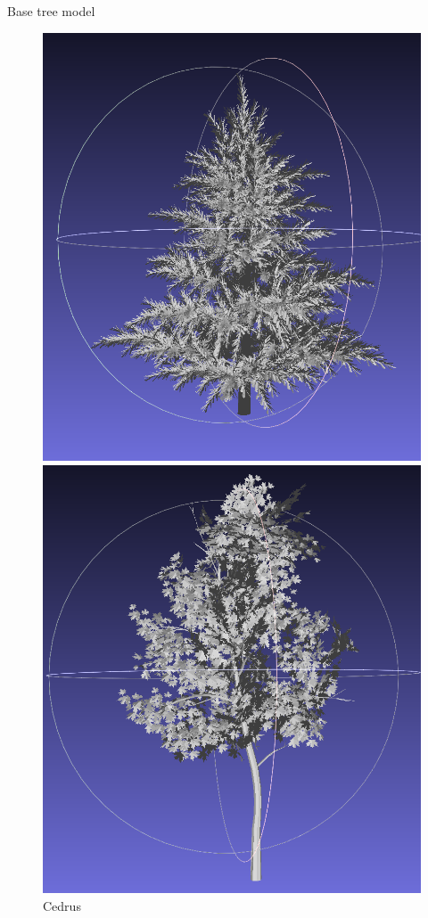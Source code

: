 \documentclass[10pt]{beamer}
\begin{document}
\begin{frame}{Base tree model}
\begin{figure}[H]
    \centering
    \begin{minipage}{0.24\textwidth}
        \centering
        \includegraphics[width=\textwidth]{images/cedrus.png}
        \caption{Cedrus}
    \end{minipage}\hfill
    \begin{minipage}{0.24\textwidth}
        \centering
        \includegraphics[width=\textwidth]{images/liquidanbar.png}

\end{minipage}
\end{figure}
\end{frame}
\end{document}
